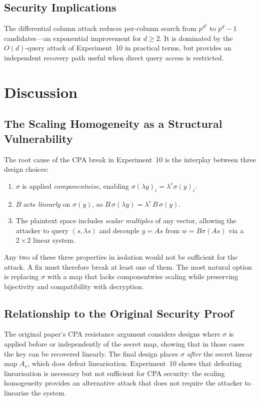 \documentclass[12pt,a4paper]{article}
\theoremstyle{definition}
\begin{document}
\subsection{Security Implications}

The differential column attack reduces per-column search from
$p^{d^2}$ to $p^d - 1$ candidates---an exponential improvement for
$d \geq 2$. It is dominated by the $O(d)$-query attack of
Experiment~10 in practical terms, but provides an independent
recovery path useful when direct query access is restricted.

\section{Discussion}

\subsection{The Scaling Homogeneity as a Structural Vulnerability}

The root cause of the CPA break in Experiment~10 is the interplay
between three design choices:
\begin{enumerate}
  \item $\sigma$ is applied \emph{componentwise}, enabling
    $\sigma(\lambda y)_i = \lambda^e \sigma(y)_i$.
  \item $B$ acts \emph{linearly} on $\sigma(y)$, so
    $B\,\sigma(\lambda y) = \lambda^e\,B\,\sigma(y)$.
  \item The plaintext space includes \emph{scalar multiples} of any
    vector, allowing the attacker to query $(s, \lambda s)$ and
    decouple $y = As$ from $w = B\sigma(As)$ via a $2\times 2$
    linear system.
\end{enumerate}
Any two of these three properties in isolation would not be sufficient
for the attack. A fix must therefore break at least one of them.
The most natural option is replacing $\sigma$ with a map that lacks
componentwise scaling while preserving bijectivity and compatibility
with decryption.

\subsection{Relationship to the Original Security Proof}

The original paper's CPA resistance argument considers designs where
$\sigma$ is applied before or independently of the secret map,
showing that in those cases the key can be recovered linearly.
The final design places $\sigma$ \emph{after} the secret linear map
$A_v$, which does defeat linearisation. Experiment~10 shows that
defeating linearisation is necessary but not sufficient for CPA
security: the scaling homogeneity provides an alternative attack that
does not require the attacker to linearise the system.
\end{document}
